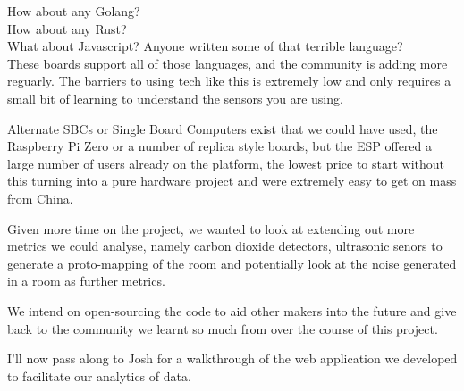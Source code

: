 \documentclass[12pt]{article}
\begin{document}
How about any Golang?
\\
How about any Rust?
\\
What about Javascript? Anyone written some of that terrible language?
\\
These boards support all of those languages, and the community is adding more 
reguarly. The barriers to using tech like this is extremely low and only 
requires a small bit of learning to understand the sensors you are using.
\\
\par\noindent
Alternate SBCs or Single Board Computers exist that we could have used, the 
Raspberry Pi Zero or a number of replica style boards, but the ESP offered 
a large number of users already on the platform, the lowest price to start 
without this turning into a pure hardware project and were extremely easy to get
on mass from China.
\\
\par\noindent
Given more time on the project, we wanted to look at extending out more 
metrics we could analyse, namely carbon dioxide detectors, ultrasonic 
senors to generate a proto-mapping of the room and potentially look at 
the noise generated in a room as further metrics.
\\
\par\noindent
We intend on open-sourcing the code to aid other makers into the future and 
give back to the community we learnt so much from over the course of this project.
\\
\par\noindent
I'll now pass along to Josh for a walkthrough of the web application we developed 
to facilitate our analytics of data.
\end{document}
